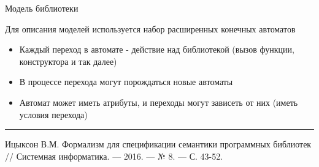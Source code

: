 \documentclass[12pt]{beamer}
\begin{document}
{
\begin{frame}{Модель библиотеки}
  \begin{mybox}[]
  Для описания моделей используется набор расширенных конечных автоматов
  \begin{itemize}
  	\item Каждый переход в автомате - действие над библиотекой (вызов функции, конструктора и так далее)
  	\item В процессе перехода могут порождаться новые автоматы
  	\item Автомат может иметь атрибуты, и переходы могут зависеть от них (иметь условия перехода)
  \end{itemize}
  \noindent\rule{4cm}{0.4pt}
  
  \begingroup
  \tiny
    	Ицыксон В.М. Формализм для спецификации семантики программных библиотек // Системная информатика. — 2016. — № 8. — С. 43-52.
  \endgroup
  \end{mybox}
\end{frame}
}

\end{document}
